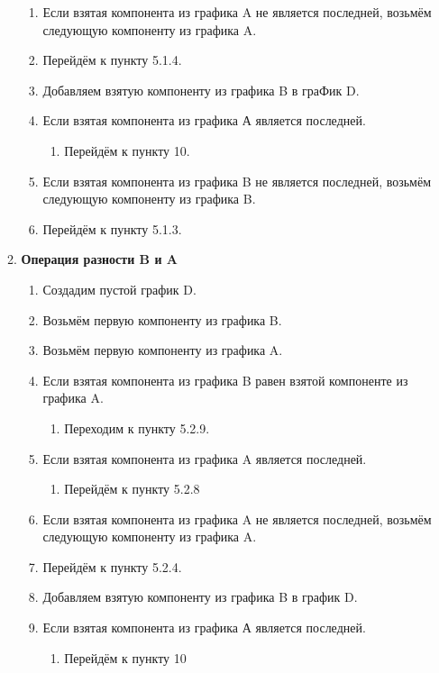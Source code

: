 \documentclass[a4paper,12pt]{extarticle}
\begin{document}
\begin{enumerate}
\begin{enumerate}[label*=\arabic*.]
\begin{enumerate}[label*=\arabic*.]
    \item Если взятая компонента из графика A не является последней, возьмём следующую компоненту из графика A.
    \item Перейдём к пункту 5.1.4.
    \item Добавляем взятую компоненту из графика B в граФик D.
    \item Если взятая компонента из графика А является последней.
    \begin{enumerate}[label*=\arabic*.]
      \item Перейдём к пункту 10.
    \end{enumerate}
    \item Если взятая компонента из графика B не является последней, возьмём следующую компоненту из графика B.
    \item Перейдём к пункту 5.1.3.
  \end{enumerate}
  \item\textbf{Операция разности B и A}
  \begin{enumerate}[label*=\arabic*.]
    \item Создадим пустой график D.
    \item Возьмём первую компоненту из графика B.
    \item Возьмём первую компоненту из графика A.
    \item Если взятая компонента из графика B равен взятой компоненте из графика A.
    \begin{enumerate}[label*=\arabic*.]
      \item Переходим к пункту 5.2.9.
    \end{enumerate}
    \item Если взятая компонента из графика A является последней.
    \begin{enumerate}[label*=\arabic*.]
      \item Перейдём к пункту 5.2.8
    \end{enumerate}
    \item Если взятая компонента из графика A не является последней, возьмём следующую компоненту из графика A.
    \item Перейдём к пункту 5.2.4.
    \item Добавляем взятую компоненту из графика B в график D.
    \item Если взятая компонента из графика А является последней.
    \begin{enumerate}[label*=\arabic*.]
      \item Перейдём к пункту 10

\end{enumerate}
\end{enumerate}
\end{enumerate}
\end{enumerate}
\end{document}
